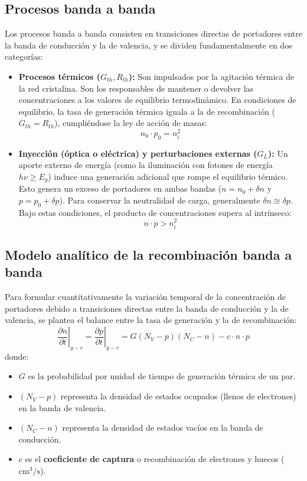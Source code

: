 \subsection{Procesos banda a banda}

Los procesos banda a banda consisten en transiciones directas de portadores entre la banda de conducción y la de valencia, y se dividen fundamentalmente en dos categorías:

\begin{itemize}
    \item \textbf{Procesos térmicos ($G_{th}, R_{th}$):} Son impulsados por la agitación térmica de la red cristalina. Son los responsables de mantener o devolver las concentraciones a los valores de equilibrio termodinámico. En condiciones de equilibrio, la tasa de generación térmica iguala a la de recombinación ($G_{th} = R_{th}$), cumpliéndose la ley de acción de masas:
    \[
    n_0 \cdot p_0 = n_i^2
    \]
    \item \textbf{Inyección (óptica o eléctrica) y perturbaciones externas ($G_L$):} Un aporte externo de energía (como la iluminación con fotones de energía $h\nu \ge E_g$) induce una generación adicional que rompe el equilibrio térmico. Esto genera un exceso de portadores en ambas bandas ($n = n_0 + \delta n$ y $p = p_0 + \delta p$). Para conservar la neutralidad de carga, generalmente $\delta n \cong \delta p$. Bajo estas condiciones, el producto de concentraciones supera al intrínseco:
    \[
    n \cdot p > n_i^2
    \]
\end{itemize}

\newpage
\subsection{Modelo analítico de la recombinación banda a banda}

Para formular cuantitativamente la variación temporal de la concentración de portadores debido a transiciones directas entre la banda de conducción y la de valencia, se plantea el balance entre la tasa de generación y la de recombinación:
\[
\left. \frac{\partial n}{\partial t} \right|_{g-r} = \left. \frac{\partial p}{\partial t} \right|_{g-r} = G (N_V - p)(N_C - n) - c \cdot n \cdot p
\]
donde:
\begin{itemize}
    \item $G$ es la probabilidad por unidad de tiempo de generación térmica de un par.
    \item $(N_V - p)$ representa la densidad de estados ocupados (llenos de electrones) en la banda de valencia.
    \item $(N_C - n)$ representa la densidad de estados vacíos en la banda de conducción.
    \item $c$ es el \textbf{coeficiente de captura} o recombinación de electrones y huecos ($\si{\cm^3\per\second}$).
\end{itemize}

